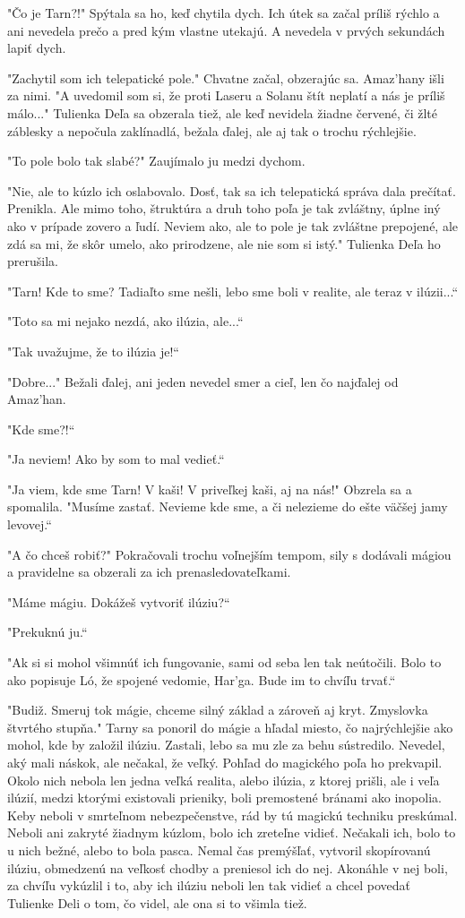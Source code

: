 \documentclass{book}
\begin{document}
"$ $Čo je Tarn?!"$ $ Spýtala sa ho, keď chytila dych. Ich útek sa začal príliš rýchlo a ani nevedela prečo a pred kým vlastne utekajú. A nevedela v prvých sekundách lapiť dych.

"$ $Zachytil som ich telepatické pole."$ $ Chvatne začal, obzerajúc sa. Amaz'hany išli za nimi. "$ $A uvedomil som si, že proti Laseru a Solanu štít neplatí a nás je príliš málo..."$ $ Tulienka Deľa sa obzerala tiež, ale keď nevidela žiadne červené, či žlté záblesky a nepočula zaklínadlá, bežala ďalej, ale aj tak o trochu rýchlejšie.

"$ $To pole bolo tak slabé?"$ $ Zaujímalo ju medzi dychom.

"$ $Nie, ale to kúzlo ich oslabovalo. Dosť, tak sa ich telepatická správa dala prečítať. Prenikla. Ale mimo toho, štruktúra a druh toho poľa je tak zvláštny, úplne iný ako v prípade zovero a ľudí. Neviem ako, ale to pole je tak zvláštne prepojené, ale zdá sa mi, že skôr umelo, ako prirodzene, ale nie som si istý."$ $ Tulienka Deľa ho prerušila.

"$ $Tarn! Kde to sme? Tadiaľto sme nešli, lebo sme boli v realite, ale teraz v ilúzii...“

"$ $Toto sa mi nejako nezdá, ako ilúzia, ale...“

"$ $Tak uvažujme, že to ilúzia je!“

"$ $Dobre..."$ $ Bežali ďalej, ani jeden nevedel smer a cieľ, len čo najďalej od Amaz'han.

"$ $Kde sme?!“

"$ $Ja neviem! Ako by som to mal vedieť.“

"$ $Ja viem, kde sme Tarn! V kaši! V priveľkej kaši, aj na nás!"$ $ Obzrela sa a spomalila. "$ $Musíme zastať. Nevieme kde sme, a či nelezieme do ešte väčšej jamy levovej.“

"$ $A čo chceš robiť?"$ $ Pokračovali trochu voľnejším tempom, sily s dodávali mágiou a pravidelne sa obzerali za ich prenasledovateľkami.

"$ $Máme mágiu. Dokážeš vytvoriť ilúziu?“

"$ $Prekuknú ju.“

"$ $Ak si si mohol všimnúť ich fungovanie, sami od seba len tak neútočili. Bolo to ako popisuje Ló, že spojené vedomie, Har'ga. Bude im to chvíľu trvať.“

"$ $Budiž. Smeruj tok mágie, chceme silný základ a zároveň aj kryt. Zmyslovka štvrtého stupňa."$ $ Tarny sa ponoril do mágie a hľadal miesto, čo najrýchlejšie ako mohol, kde by založil ilúziu. Zastali, lebo sa mu zle za behu sústredilo. Nevedel, aký mali náskok, ale nečakal, že veľký. Pohľad do magického poľa ho prekvapil. Okolo nich nebola len jedna veľká realita, alebo ilúzia, z ktorej prišli, ale i veľa ilúzií, medzi ktorými existovali prieniky, boli premostené bránami ako inopolia. Keby neboli v smrteľnom nebezpečenstve, rád by tú magickú techniku preskúmal. Neboli ani zakryté žiadnym kúzlom, bolo ich zreteľne vidieť. Nečakali ich, bolo to u nich bežné, alebo to bola pasca. Nemal čas premýšľať, vytvoril skopírovanú ilúziu, obmedzenú na veľkosť chodby a preniesol ich do nej. Akonáhle v nej boli, za chvíľu vykúzlil i to, aby ich ilúziu neboli len tak vidieť a chcel povedať Tulienke Deli o tom, čo videl, ale ona si to všimla tiež.
\end{document}
